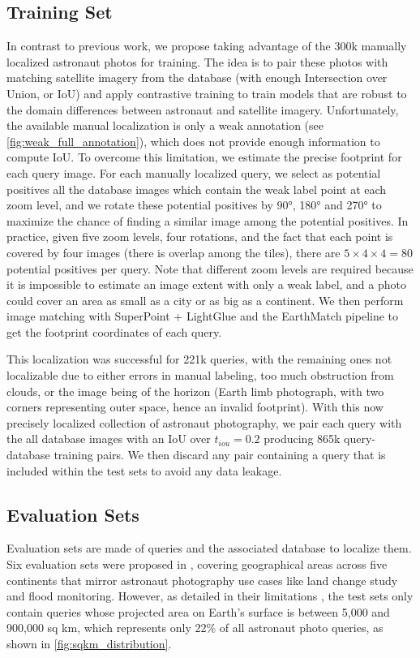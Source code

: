 \subsection{Training Set}
\label{sec:train_set}
In contrast to previous work, we propose taking advantage of the 300k manually localized astronaut photos for training.
The idea is to pair these photos with matching satellite imagery from the database (\ie with enough Intersection over Union, or IoU) and apply contrastive training to train models that are robust to the domain differences between astronaut and satellite imagery.
Unfortunately, the available manual localization is only a weak annotation (see \cref{fig:weak_full_annotation}), which does not provide enough information to compute IoU. To overcome this limitation, we estimate the precise footprint for each query image.
For each manually localized query, we select
as potential positives all the database images which contain the weak label point at each zoom level, and we rotate these potential positives by 90°, 180° and 270° to maximize the chance of finding a similar image among the potential positives. In practice, given five zoom levels, four rotations, and the fact that each point is covered by four images (there is overlap among the tiles), there are $5 \times 4 \times 4 = 80$ potential positives per query.
Note that different zoom levels are required because it is impossible to estimate an image extent with only a weak label, and a photo could cover an area as small as a city or as big as a continent.
We then perform image matching with SuperPoint \cite{Detone_2018_superpoint} + LightGlue \cite{Lindenberger_2023_lightglue} and the EarthMatch pipeline \cite{Berton_2024_EarthMatch} to get the footprint coordinates of each query.

This localization was successful for 221k queries, with the remaining ones not localizable due to either errors in manual labeling, too much obstruction from clouds, or the image being of the horizon (\ie Earth limb photograph, with two corners representing outer space, hence an invalid footprint).
With this now precisely localized collection of astronaut photography, we pair each query with the all database images with an IoU over $t_{iou}=0.2$ producing 865k query-database training pairs.
We then discard any pair containing a query that is included within the test sets to avoid any data leakage.


\subsection{Evaluation Sets}
\label{sec:evaluation_sets}
Evaluation sets are made of queries and the associated database to localize them.
Six evaluation sets were proposed in \cite{Berton_2024_EarthLoc}, covering geographical areas across five continents that mirror astronaut photography use cases like land change study and flood monitoring.
However, as detailed in their limitations \cite{Berton_2024_EarthLoc}, the test sets only contain queries whose projected area on Earth's surface is between 5,000 and 900,000 sq km, which represents only 22\% of all astronaut photo queries, as shown in \cref{fig:sqkm_distribution}.

